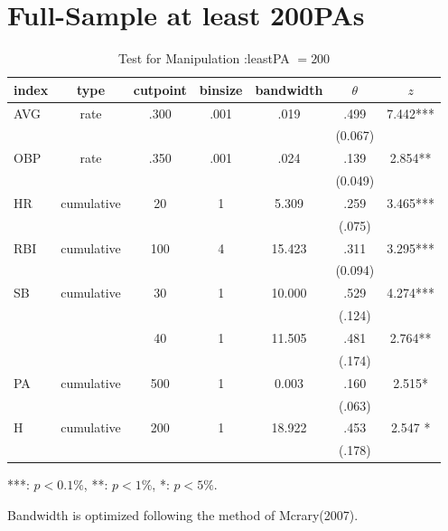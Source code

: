 \documentclass[dvipdfmx, 12pt]{article}
\begin{document}
\section{Full-Sample at least 200PAs}



\begin{table}[H]
  \small
  \centering
  \begin{tabular}{lcccccc}\hline
    index & type & cutpoint & binsize & bandwidth & $\theta$ & $z$
    \\ \hline \hline
    AVG & rate & .300 & .001 & .019 &  .499 & 7.442*** \\
    & & & & & (0.067) & \\
    OBP & rate & .350 & .001 & .024 &  .139 & 2.854** \\
    & & & & & (0.049) &  \\
    HR & cumulative & 20 & 1 & 5.309 & .259 & 3.465*** \\
    & & & & & (.075)  & \\
    RBI & cumulative & 100 & 4 & 15.423 & .311 & 3.295*** \\
    & & & & & (0.094) & \\
    SB & cumulative & 30 & 1 & 10.000 & .529 & 4.274*** \\
    & & & & & (.124) & \\
    & & 40 & 1 & 11.505 & .481 & 2.764** \\
    & & & & & (.174) & \\
    PA & cumulative & 500 & 1 & 0.003 & .160 & 2.515* \\
    & & & & &(.063) & \\
    H & cumulative & 200 & 1 & 18.922 & .453 & 2.547 * \\
    & & & & & (.178) & \\ \hline \hline
  \end{tabular}
  \footnotesize
  \flushright
      ***: $p<0.1\%$, **: $p<1\%$, *: $p<5\%$.

    Bandwidth is optimized following the method of Mcrary(2007).
  \caption{Test for Manipulation :leastPA $= 200$}
\end{table}

\newpage
\end{document}

